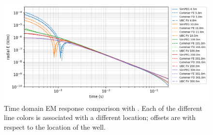 \begin{figure}[htb]
    \begin{center}
    \includegraphics[width=\columnwidth]{figures/commer_results.png}
    \end{center}
\caption{Time domain EM response comparison with \citep{Commer2015}. Each of the different line colors is associated with a different location; offsets are with respect to the location of the well.}
\label{fig:commer_results}
\end{figure}
